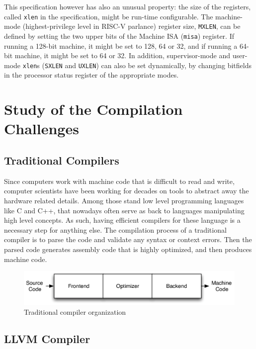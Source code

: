\documentclass[a4paper,conference]{IEEEtran}
\newcommand{\riscv}{\textsc{\small RISC-V}\xspace}
\begin{document}
This specification however has also an unusual property: the size of the registers, called \texttt{xlen} in the specification, might be run-time configurable.
The machine-mode (highest-privilege level in \riscv parlance) register size, \texttt{MXLEN}, can be defined by setting the two upper bits of the Machine ISA (\texttt{misa}) register.
If running a 128-bit machine, it might be set to 128, 64 or 32, and if running a 64-bit machine, it might be set to 64 or 32.
In addition, supervisor-mode and user-mode \texttt{xlen}s (\texttt{SXLEN} and \texttt{UXLEN}) can also be set dynamically, by changing bitfields in the processor status register of the appropriate modes.

\section{Study of the Compilation Challenges}

\subsection{Traditional Compilers}

Since computers work with machine code that is difficult to read and write, computer scientists have been working for decades on tools to abstract away the hardware related details. Among those stand low level programming languages like C and C++, that nowadays often serve as back to languages manipulating high level concepts. As such, having efficient compilers for these language is a necessary step for anything else. The compilation process of a traditional compiler is to parse the code and validate any syntax or context errors. Then the parsed code generates assembly code that is highly optimized, and then produces machine code.

\label{sec:di}
\begin{figure}[hbtp]\center\leavevmode
	\includegraphics[width=1\linewidth]{svg/SimpleCompiler.png}
	\caption{Traditional compiler organization}
	\label{fig:llvm}
\end{figure}

\subsection{LLVM Compiler}
\label{sec:di}
\end{document}
